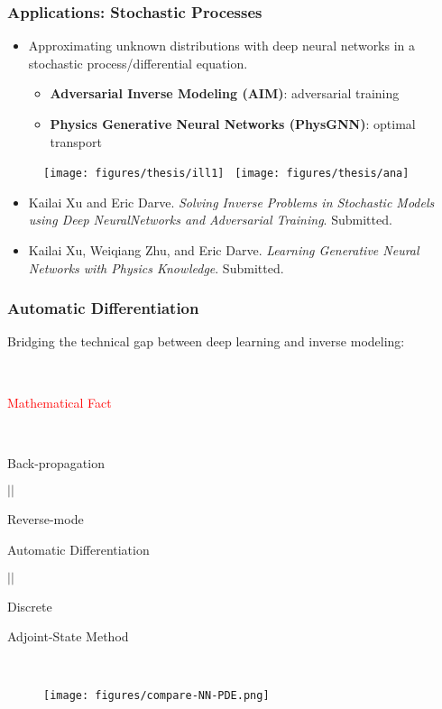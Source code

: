\documentclass[usenames,dvipsnames]{beamer}
\begin{document}
\begin{frame}
	\frametitle{Applications: Stochastic Processes}
	\begin{itemize}
		\item Approximating unknown distributions with deep neural networks in a stochastic process/differential equation. 
		\begin{itemize}
			\item \textbf{Adversarial Inverse Modeling (AIM)}: adversarial training
			\item \textbf{Physics Generative Neural Networks (PhysGNN)}: optimal transport
		\end{itemize}
	\end{itemize}
	\begin{figure}[hbt]
		\centering
		\texttt{[image: figures/thesis/ill1]}~				\texttt{[image: figures/thesis/ana]}
	\end{figure}
	
		\vspace{-0.2cm}
	{
		\tiny
		
		\begin{itemize}
			\item[] 	Kailai Xu and Eric Darve. \textit{Solving Inverse Problems in Stochastic Models using Deep NeuralNetworks and Adversarial Training}. Submitted.
			
			\item[] 	Kailai Xu, Weiqiang Zhu, and Eric Darve. \textit{Learning Generative Neural Networks with Physics Knowledge}. Submitted.
		\end{itemize}
	}
	
\end{frame}

\begin{frame}
	\frametitle{Automatic Differentiation}
	Bridging the technical gap between deep learning and inverse modeling: 
	
	
	\begin{minipage}[t]{0.4\textwidth}
		
		\
		
		
		
		\begin{center}
			\textcolor{red}{Mathematical Fact}
			
			\
			
			Back-propagation 
			
			$||$
			
			Reverse-mode
			
			Automatic Differentiation 
			
			$||$
			
			Discrete 
			
			Adjoint-State Method
		\end{center}
	\end{minipage}~
	\begin{minipage}[t]{0.6\textwidth}
		\begin{figure}[hbt]
			\texttt{[image: figures/compare-NN-PDE.png]}
		\end{figure}
	\end{minipage}
	
\end{frame}
\end{document}

